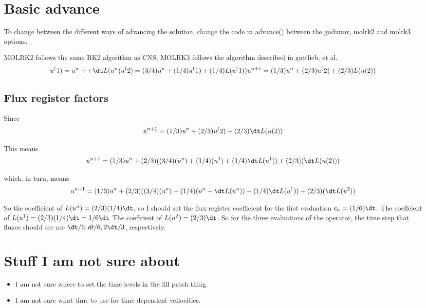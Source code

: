 \section{Basic advance}
To change between the different ways of advancing the solution, change
the code in advance() between the godunov, molrk2 and molrk3 options.

MOLRK2 follows the same RK2 algorithm as CNS.
MOLRK3 follows the algorithm described in gottlieb, et al.
$$
u^(1) = u^n +  + \dt L(u^n)  \\
u^(2) = (3/4) u^n + (1/4) u^(1)  + (1/4) L(u^(1))
u^{n+1} = (1/3) u^n + (2/3) u^(2)  + (2/3) L(u(2))
$$

\subsection{Flux register factors}

Since 
$$
u^{n+1} = (1/3) u^n + (2/3) u^(2)  + (2/3) \dt L(u(2))
$$

This means 
$$
u^{n+1} = (1/3) u^n + (2/3)((3/4)(u^n) + (1/4)(u^1) + (1/4)\dt L(u^1))  + (2/3)( \dt L(u(2)))
$$

which, in turn, means
$$
u^{n+1} = (1/3) u^n + (2/3)((3/4)(u^n) + (1/4)(u^n + \dt L(u^n)) + (1/4)\dt L(u^1))  + (2/3)( \dt L(u^2))
$$

So the coefficient of $L(u^n) = (2/3)(1/4)\dt$, so I should set the
flux register coefficient for the first evaluation $c_n = (1/6)\dt$.
The coeffcient of $L(u^1) = (2/3)(1/4)\dt = 1/6 \dt$
The coeffcient of $L(u^2) = (2/3) \dt$.   So for the three evaluations
of the operator, the time step  that fluxes should see are $\dt/6,
dt/6, 2\dt/3$, respectively.


\section{Stuff I am not sure about}

\begin{itemize}
  \item I am not sure where to set the time levels  in the fill patch thing.
  \item I am not sure what time to use for time dependent
    vellocities.   
\end{itemize}
